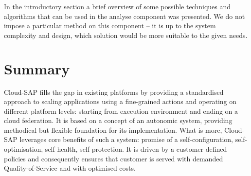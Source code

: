 In the introductory section a brief overview of some possible techniques and algorithms that can be used in the analyse component was presented. We do not impose a particular method on this component -- it is up to the system complexity and design, which solution would be more suitable to the given needs.

\section{Summary}
Cloud-SAP fills the gap in existing platforms by providing a standardised approach to scaling applications using a fine-grained actions and operating on different platform levels: starting from execution environment and ending on a cloud federation. It is based on a concept of an autonomic system, providing methodical but flexible foundation for its implementation. What is more, Cloud-SAP leverages core benefits of such a system: promise of a self-configuration, self-optimisation, self-health, self-protection. It is driven by a customer-defined policies and consequently ensures that customer is served with demanded Quality-of-Service and with optimised costs.


